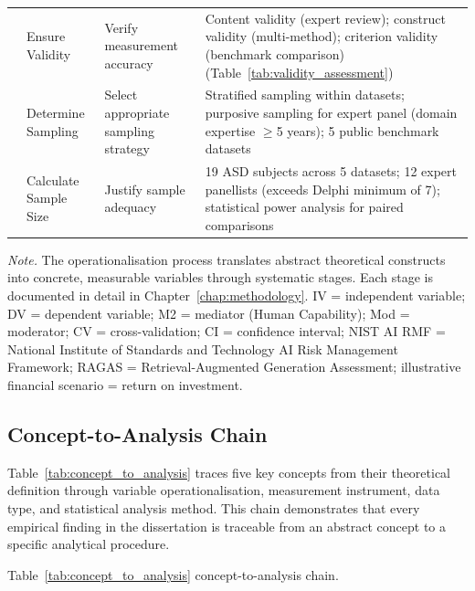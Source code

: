 {\begin{xltabular}{\textwidth}{@{} >{\raggedright\arraybackslash}p{0.4cm} >{\raggedright\arraybackslash}p{2.2cm} L L @{}}
 & Ensure Validity & Verify measurement accuracy & Content validity (expert review); construct validity (multi-method); criterion validity (benchmark comparison) (Table~\ref{tab:validity_assessment}) \\
 & Determine Sampling & Select appropriate sampling strategy & Stratified sampling within datasets; purposive sampling for expert panel (domain expertise $\geq$5 years); 5 public benchmark datasets \\
 & Calculate Sample Size & Justify sample adequacy & 19 ASD subjects across 5 datasets; 12 expert panellists (exceeds Delphi minimum of 7); statistical power analysis for paired comparisons \\
\end{xltabular}}
\vspace{0.5em}
\noindent\textit{Note.} The operationalisation process translates abstract theoretical constructs into concrete, measurable variables through systematic stages. Each stage is documented in detail in Chapter~\ref{chap:methodology}. IV = independent variable; DV = dependent variable; M2 = mediator (Human Capability); Mod = moderator; CV = cross-validation; CI = confidence interval; NIST AI RMF = National Institute of Standards and Technology AI Risk Management Framework; RAGAS = Retrieval-Augmented Generation Assessment; illustrative financial scenario = return on investment.

\subsection{Concept-to-Analysis Chain}

Table~\ref{tab:concept_to_analysis} traces five key concepts from their theoretical definition through variable operationalisation, measurement instrument, data type, and statistical analysis method. This chain demonstrates that every empirical finding in the dissertation is traceable from an abstract concept to a specific analytical procedure.


\noindent Table~\ref{tab:concept_to_analysis} concept-to-analysis chain.

